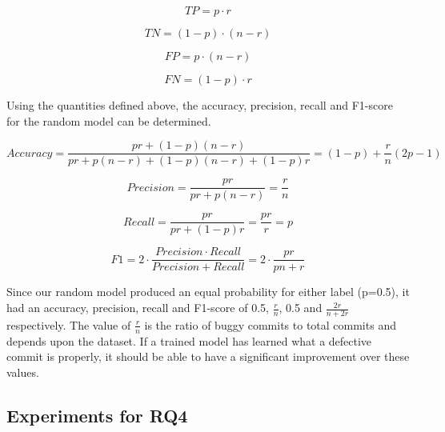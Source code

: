 \documentclass[../main.tex]{subfiles}
\begin{document}
\begin{equation}
     TP = p \cdot r
\end{equation}

\begin{equation}
     TN = (1-p) \cdot (n-r)
\end{equation}

\begin{equation}
     FP = p \cdot (n-r)
\end{equation}

\begin{equation}
     FN = (1-p) \cdot r
\end{equation}

\vspace{10pt}

Using the quantities defined above, the accuracy, precision, recall and F1-score for the random model can be determined.
   
\begin{equation}\label{eqn:randAccuracy}
     Accuracy = \frac{pr+(1-p)(n-r)}{pr+p(n-r)+(1-p)(n-r)+(1-p)r} = (1-p) + \frac{r}{n}(2p-1)
\end{equation}

\begin{equation}\label{eqn:randPrecision}
    Precision = \frac{pr}{pr+p(n-r)} = \frac{r}{n}
\end{equation}

\begin{equation}\label{eqn:randRecall}
    Recall = \frac{pr}{pr+(1-p)r}=\frac{pr}{r} = p
\end{equation}


\begin{equation}\label{eqn:randF1}
    F1 = 2 \cdot \frac{Precision \cdot Recall}{Precision + Recall} = 2 \cdot \frac{pr}{pn+r} 
\end{equation}

\vspace{20pt}

Since our random model produced an equal probability for either label (p=0.5), it had an accuracy, precision, recall and F1-score of 0.5, $\frac{r}{n}$, 0.5 and $\frac{2r}{n+2r}$ respectively. The value of $\frac{r}{n}$ is the ratio of buggy commits to total commits and depends upon the dataset. If a trained model has learned what a defective commit is properly, it should be able to have a significant improvement over these values. 

\subsection{Experiments for RQ4}
\end{document}

